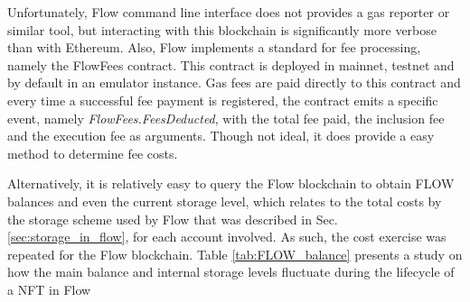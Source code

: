 \documentclass[../main.tex]{subfiles}
\begin{document}
Unfortunately, Flow command line interface does not provides a gas reporter or similar tool, but interacting with this blockchain is significantly more verbose than with Ethereum. Also, Flow implements a standard for fee processing, namely the FlowFees contract. This contract is deployed in mainnet, testnet and by default in an emulator instance. Gas fees are paid directly to this contract and every time a successful fee payment is registered, the contract emits a specific event, namely \textit{FlowFees.FeesDeducted}, with the total fee paid, the inclusion fee and the execution fee as arguments. Though not ideal, it does provide a easy method to determine fee costs.
\par
Alternatively, it is relatively easy to query the Flow blockchain to obtain FLOW balances and even the current storage level, which relates to the total costs by the storage scheme used by Flow that was described in Sec. \ref{sec:storage_in_flow}, for each account involved. As such, the cost exercise was repeated for the Flow blockchain. Table \ref{tab:FLOW_balance} presents a study on how the main balance and internal storage levels fluctuate during the lifecycle of a NFT in Flow
\end{document}
